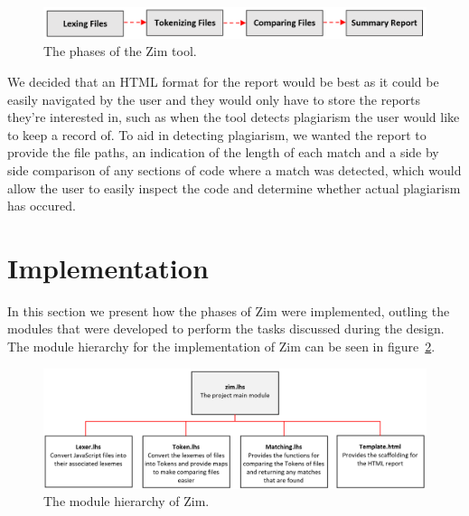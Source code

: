\documentclass[11pt, a4paper]{article}
\begin{document}
\begin{figure}[h]
\begin{center}
\includegraphics[scale=0.82]{ZimDesign}
\end{center}
\caption{\label{fig:design}The phases of the Zim tool.}
\end{figure}

We decided that an HTML format for the report would be best as it could be easily navigated by the user and they would only have to store the reports they're interested in, such as when the tool detects plagiarism the user would like to keep a record of. To aid in detecting plagiarism, we wanted the report to provide the file paths, an indication of the length of each match and a side by side comparison of any sections of code where a match was detected, which would allow the user to easily inspect the code and determine whether actual plagiarism has occured.

\section{Implementation}

In this section we present how the phases of Zim were implemented, outling the modules that were developed to perform the tasks discussed during the design. The module hierarchy for the implementation of Zim can be seen in figure~\ref{fig:implementation}.

\begin{figure}
\begin{center}
\includegraphics[scale=0.74]{ZimImplementationSummary}
\end{center}
\caption{\label{fig:implementation}The module hierarchy of Zim.}
\end{figure}






\end{document}
